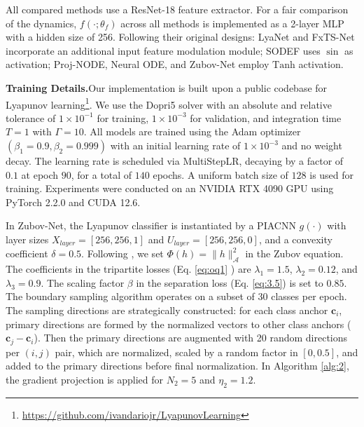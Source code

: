 \documentclass[journal]{IEEEtran}
\begin{document}
All compared methods use a ResNet-18 feature extractor. For a fair comparison of the dynamics, $f(\cdot; \theta_f)$ across all methods is implemented as a 2-layer MLP with a hidden size of 256. Following their original designs: LyaNet and FxTS-Net incorporate an additional input feature modulation module; SODEF uses $\sin$ as activation; Proj-NODE, Neural ODE, and Zubov-Net employ $\mathrm{Tanh}$ activation.




\noindent  \textbf{Training Details.}\quad  Our implementation is built upon a public codebase for Lyapunov learning\footnote{\url{https://github.com/ivandariojr/LyapunovLearning}}. We use the Dopri5 solver with an absolute and relative tolerance of $1\times10^{-1}$ for training, $1\times10^{-3}$ for validation, and integration time $T=1$ with $\Gamma=10$. All models are trained using the Adam optimizer $(\beta_1=0.9, \beta_2=0.999)$ with an initial learning rate of $1\times10^{-3}$ and no weight decay. The learning rate is scheduled via MultiStepLR, decaying by a factor of $0.1$ at epoch $90$, for a total of $140$ epochs. A uniform batch size of $128$ is used for training.  Experiments were conducted on an NVIDIA RTX 4090 GPU using PyTorch 2.2.0 and CUDA 12.6.

In Zubov-Net, the Lyapunov classifier is instantiated by a PIACNN $g(\cdot)$ with layer sizes $X_{layer} = [256, 256, 1]$ and $U_{layer} = [256, 256, 0]$, and a convexity coefficient $\delta = 0.5$. Following \cite{liu2025physics}, we set $\Phi(h) = \|h\|_{\mathcal{A}}^2$ in the Zubov equation.  The coefficients in the tripartite losses (Eq. \eqref{eq:oq1} ) are $\lambda_1 = 1.5$, $\lambda_2 =  0.12$, and $\lambda_3= 0.9$. The scaling factor $\beta$ in the separation loss (Eq. \eqref{eq:3.5}) is set to $ 0.85$. The boundary sampling algorithm operates on a subset of $30$ classes per epoch. The sampling directions are strategically constructed: for each class anchor $\mathbf{c}_i$, primary directions are formed by the normalized vectors to other class anchors ($\mathbf{c}_j - \mathbf{c}_i$). Then the primary directions are augmented with 20 random directions per $(i,j)$ pair, which are normalized, scaled by a random factor in $[0, 0.5]$, and added to the primary directions before final normalization. In Algorithm \ref{alg:2}, the gradient projection  is applied for $N_2 = 5$ and $\eta_{2}=1.2$. 
\end{document}
